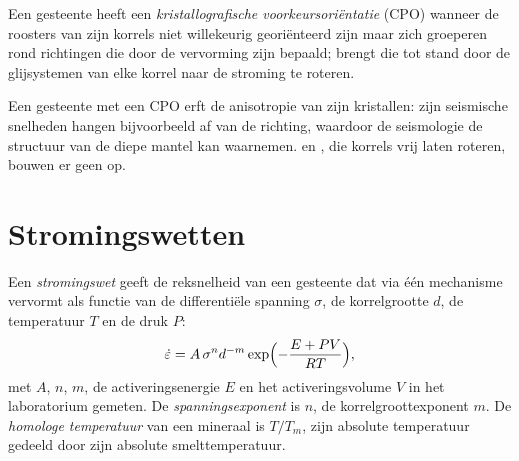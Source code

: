 \begin{definition}\label{def:b3:deformation-mechanisms:cpo}
Een gesteente heeft een \emph{kristallografische voorkeursoriëntatie}
(CPO) wanneer de roosters van zijn korrels niet willekeurig georiënteerd zijn
maar zich groeperen rond richtingen die door de vervorming zijn bepaald; 
brengt die tot stand door de glijsystemen van elke korrel naar de stroming te roteren.
\end{definition}

Een gesteente met een CPO erft de anisotropie van zijn kristallen: zijn seismische snelheden
hangen bijvoorbeeld af van de richting, waardoor de seismologie de structuur van
de diepe mantel kan waarnemen.  en , die korrels
vrij laten roteren, bouwen er geen op.

\section{Stromingswetten}

\begin{definition}\label{def:b3:deformation-mechanisms:flow-law}
Een \emph{stromingswet} geeft de reksnelheid van een gesteente dat via één mechanisme
vervormt als functie van de differentiële spanning $\sigma$, de korrelgrootte
$d$, de temperatuur $T$ en de druk $P$:
\[
  \dot\varepsilon = A\,\sigma^nd^{-m}\exp\Bigl(-\frac{E + PV}{RT}\Bigr),
\]
met $A$, $n$, $m$, de activeringsenergie $E$ en het activeringsvolume $V$
in het laboratorium gemeten. De \emph{spanningsexponent}
is $n$, de korrelgroottexponent $m$. De \emph{homologe
temperatuur} van een mineraal is $T/T_m$, zijn
absolute temperatuur gedeeld door zijn absolute smelttemperatuur.
\end{definition}

